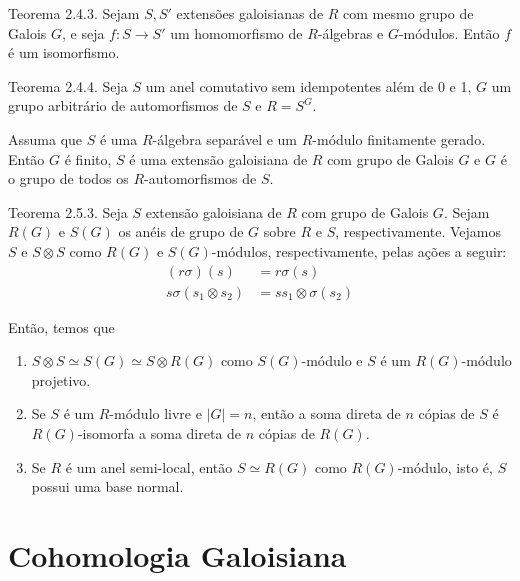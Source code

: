 \documentclass{beamer}
\begin{document}
\begin{frame}{Teorema 2.4.3.}
    Sejam $S,S'$ extensões galoisianas de $R$ com mesmo grupo de Galois $G$, e seja $f: S \rightarrow S'$ um homomorfismo de $R$-álgebras e $G$-módulos. Então $f$ é um isomorfismo.
    
    
    \end{frame}
    
\begin{frame}{Teorema 2.4.4.}
    Seja $S$ um anel comutativo sem idempotentes além de 0 e 1, $G$ um grupo arbitrário de automorfismos de $S$ e $R=S^G$. \par Assuma que $S$ é uma $R$-álgebra separável e um $R$-módulo finitamente gerado. Então $G$ é finito, $S$ é uma extensão galoisiana de $R$ com grupo de Galois $G$ e $G$ é o grupo de todos os $R$-automorfismos de $S$.
\end{frame}

\begin{frame}{Teorema 2.5.3.}
    Seja $S$ extensão galoisiana de $R$ com grupo de Galois $G$. Sejam $R(G)$ e $S(G)$ os anéis de grupo de $G$ sobre $R$ e $S$, respectivamente. Vejamos $S$ e $S\otimes S$ como $R(G)$ e $S(G)$-módulos, respectivamente, pelas ações a seguir:
\begin{align*}
(r\sigma)(s) &= r\sigma(s) \\
s\sigma(s_1\otimes s_2) &= ss_1 \otimes \sigma(s_2)
\end{align*}
\end{frame}

\begin{frame}
    Então, temos que 
\begin{enumerate}
    \item $S\otimes S \simeq S(G) \simeq S\otimes R(G)$ como $S(G)$-módulo e $S$ é um $R(G)$-módulo projetivo.
    \item Se $S$ é um $R$-módulo livre e $|G|=n$, então a soma direta de $n$ cópias de $S$ é $R(G)$-isomorfa a soma direta de $n$ cópias de $R(G)$.
    \item Se $R$ é um anel semi-local, então $S\simeq R(G)$ como $R(G)$-módulo, isto é, $S$ possui uma base normal.
\end{enumerate}
\end{frame}

            \section{Cohomologia Galoisiana}
\end{document}
